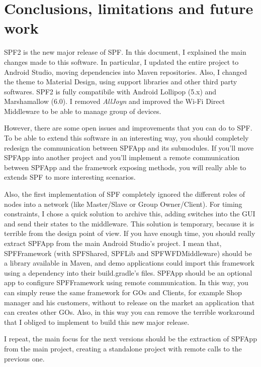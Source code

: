 \chapter{Conclusions, limitations and future work}
\label{conclusion}

SPF2 is the new major release of SPF. In this document, I explained the main changes made to this software. In particular, I updated the entire project to Android Studio, moving dependencies into Maven repositories. Also, I changed the theme to Material Design, using support libraries and other third party softwares. SPF2 is fully compatibile with Android Lollipop (5.x) and Marshamallow (6.0). I removed \emph{AllJoyn} and improved the Wi-Fi Direct Middleware to be able to manage group of devices.

However, there are some open issues and improvements that you can do to SPF. To be able to extend this software in an interesting way, you should completely redesign the communication between SPFApp and its submodules. If you'll move SPFApp into another project and you'll implement a remote communication between SPFApp and the framework exposing methods, you will really able to extends SPF to more interesting scenarios.

Also, the first implementation of SPF completely ignored the different roles of nodes into a network (like Master/Slave or Group Owner/Client). For timing constraints, I chose a quick solution to archive this, adding switches into the GUI and send their states to the middleware. This solution is temporary, because it is terrible from the design point of view. If you have enough time, you should really extract \textsf{SPFApp} from the main Android Studio's project. I mean that, \textsf{SPFFramework} (with \textsf{SPFShared}, \textsf{SPFLib} and \textsf{SPFWFDMiddleware}) should be a library available in Maven, and demo applications could import this framework using a dependency into their \textsf{build.gradle}'s files. \textsf{SPFApp} should be an optional app to configure \textsf{SPFFramework} using remote communication. In this way, you can simply reuse the same framework for GOs and Clients, for example Shop manager and his customers, without to release on the market an application that can creates other GOs. Also, in this way you can remove the terrible workaround that I obliged to implement to build this new major release.

I repeat, the main focus for the next versions should be the extraction of \textsf{SPFApp} from the main project, creating a standalone project with remote calls to the previous one.



